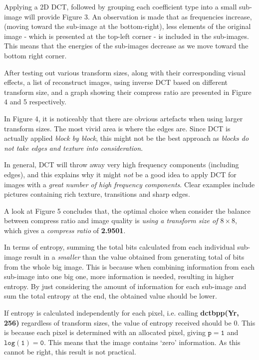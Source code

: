\documentclass[a4paper, 11pt]{article}
\begin{document}
Applying a 2D DCT, followed by grouping each coefficient type into a small sub-image will provide Figure 3. An observation is made that as frequencies increase, (moving toward the sub-image at the bottom-right), less elements of the original image - which is presented at the top-left corner - is included in the sub-images. This means that the energies of the sub-images decrease as we move toward the bottom right corner.

After testing out various transform sizes, along with their corresponding visual effects, a list of reconstruct images, using inverse DCT based on different transform size, and a graph showing their compress ratio are presented in Figure 4 and 5 respectively. 

In Figure 4, it is noticeably that there are obvious artefacts when using larger transform sizes. The most vivid area is where the edges are. Since DCT is actually applied \textit{block by block}, this might not be the best approach as \textit{blocks do not take edges and texture into consideration}. 

In general, DCT will throw away very high frequency components (including edges), and this explains why it might \textit{not} be a good idea to apply DCT for images with a \textit{great number of high frequency components}. Clear examples include pictures containing rich texture, transitions and sharp edges. 

A look at Figure 5 concludes that, the optimal choice when consider the balance between compress ratio and image quality is \textit{using a transform size of $8\times8$}, which gives a \textit{compress ratio} of \textbf{2.9501}.

In terms of entropy, summing the total bits calculated from each individual sub-image result in a \textit{smaller} than the value obtained from generating total of bits from the whole big image. This is because when combining information from each sub-image into one big one, more information is needed, resulting in higher entropy. By just considering the amount of information for each sub-image and sum the total entropy at the end, the obtained value should be lower. 

If entropy is calculated independently for each pixel, i.e. calling \textbf{dctbpp(Yr, 256)} regardless of transform sizes, the value of entropy received should be 0. This is because each pixel is determined with an allocated pixel, giving $\mathtt{p = 1}$ and $\mathtt{log(1) = 0}$. This means that the image contains `zero' information. As this cannot be right, this result is not practical.
\end{document}
